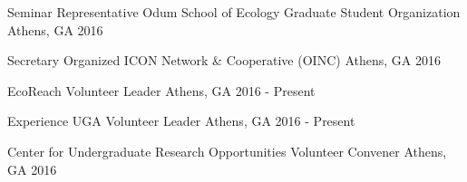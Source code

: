 

\begin{cvhonors}
\cvhonor
    {Seminar Representative} %
    {Odum School of Ecology Graduate Student Organization} %
    {Athens, GA} %
    {2016} %

\cvhonor
    {Secretary} %
    {Organized ICON Network \& Cooperative (OINC)} %
    {Athens, GA} %
    {2016} %

\end{cvhonors}


\begin{cvhonors}


    \cvhonor
      {EcoReach}
      {Volunteer Leader}
      {Athens, GA}
      {2016 - Present}

    \cvhonor
      {Experience UGA}
      {Volunteer Leader}
      {Athens, GA}
      {2016 - Present}

    \cvhonor
      {Center for Undergraduate Research Opportunities} %
      {Volunteer Convener} %
      {Athens, GA} %
      {2016} %
\end{cvhonors}


